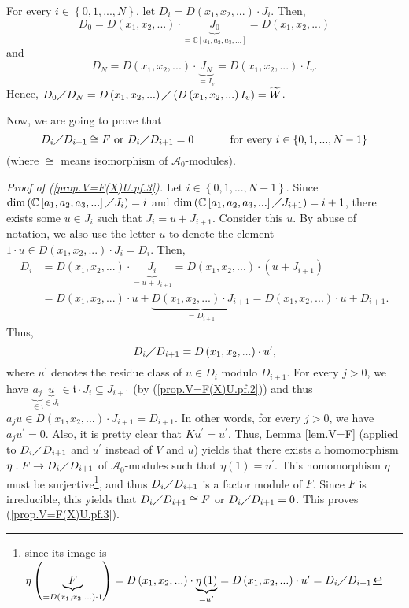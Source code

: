 \documentclass
[numbers=enddot,12pt,final,onecolumn,german,notitlepage]{scrartcl}%
\theoremstyle{definition}
\begin{document}
For every $i\in\left\{  0,1,...,N\right\}  $, let $D_{i}=D\left(  x_{1}%
,x_{2},...\right)  \cdot J_{i}$. Then,%
\[
D_{0}=D\left(  x_{1},x_{2},...\right)  \cdot\underbrace{J_{0}}_{=\mathbb{C}%
\left[  a_{1},a_{2},a_{3},...\right]  }=D\left(  x_{1},x_{2},...\right)
\]
and%
\[
D_{N}=D\left(  x_{1},x_{2},...\right)  \cdot\underbrace{J_{N}}_{=I_{v}%
}=D\left(  x_{1},x_{2},...\right)  \cdot I_{v}.
\]
Hence, $D_{0}\diagup D_{N}=D\left(  x_{1},x_{2},...\right)  \diagup\left(
D\left(  x_{1},x_{2},...\right)  I_{v}\right)  =\widetilde{W}$.

Now, we are going to prove that%
\begin{equation}
D_{i}\diagup D_{i+1}\cong F\text{ or }D_{i}\diagup D_{i+1}%
=0\ \ \ \ \ \ \ \ \ \ \text{for every }i\in\left\{  0,1,...,N-1\right\}
\label{prop.V=F(X)U.pf.3}%
\end{equation}
(where $\cong$ means isomorphism of $\mathcal{A}_{0}$-modules).

\textit{Proof of (\ref{prop.V=F(X)U.pf.3}).} Let $i\in\left\{
0,1,...,N-1\right\}  $. Since $\dim\left(  \mathbb{C}\left[  a_{1},a_{2}%
,a_{3},...\right]  \diagup J_{i}\right)  =i$ and $\dim\left(  \mathbb{C}%
\left[  a_{1},a_{2},a_{3},...\right]  \diagup J_{i+1}\right)  =i+1$, there
exists some $u\in J_{i}$ such that $J_{i}=u+J_{i+1}$. Consider this $u$. By
abuse of notation, we also use the letter $u$ to denote the element $1\cdot
u\in D\left(  x_{1},x_{2},...\right)  \cdot J_{i}=D_{i}$. Then,
\begin{align*}
D_{i}  &  =D\left(  x_{1},x_{2},...\right)  \cdot\underbrace{J_{i}%
}_{=u+J_{i+1}}=D\left(  x_{1},x_{2},...\right)  \cdot\left(  u+J_{i+1}\right)
\\
&  =D\left(  x_{1},x_{2},...\right)  \cdot u+\underbrace{D\left(  x_{1}%
,x_{2},...\right)  \cdot J_{i+1}}_{=D_{i+1}}=D\left(  x_{1},x_{2},...\right)
\cdot u+D_{i+1}.
\end{align*}
Thus,
\[
D_{i}\diagup D_{i+1}=D\left(  x_{1},x_{2},...\right)  \cdot u^{\prime},
\]
where $u^{\prime}$ denotes the residue class of $u\in D_{i}$ modulo $D_{i+1}$.
For every $j>0$, we have $\underbrace{a_{j}}_{\in\mathfrak{i}}\underbrace{u}%
_{\in J_{i}}\in\mathfrak{i}\cdot J_{i}\subseteq J_{i+1}$ (by
(\ref{prop.V=F(X)U.pf.2})) and thus $a_{j}u\in D\left(  x_{1},x_{2}%
,...\right)  \cdot J_{i+1}=D_{i+1}$. In other words, for every $j>0$, we have
$a_{j}u^{\prime}=0$. Also, it is pretty clear that $Ku^{\prime}=u^{\prime}$.
Thus, Lemma \ref{lem.V=F} (applied to $D_{i}\diagup D_{i+1}$ and $u^{\prime}$
instead of $V$ and $u$) yields that there exists a homomorphism $\eta
:F\rightarrow D_{i}\diagup D_{i+1}$ of $\mathcal{A}_{0}$-modules such that
$\eta\left(  1\right)  =u^{\prime}$. This homomorphism $\eta$ must be
surjective\footnote{since its image is $\eta\left(  \underbrace{F}_{=D\left(
x_{1},x_{2},...\right)  \cdot1}\right)  =D\left(  x_{1},x_{2},...\right)
\cdot\underbrace{\eta\left(  1\right)  }_{=u^{\prime}}=D\left(  x_{1}%
,x_{2},...\right)  \cdot u^{\prime}=D_{i}\diagup D_{i+1}$}, and thus
$D_{i}\diagup D_{i+1}$ is a factor module of $F$. Since $F$ is irreducible,
this yields that $D_{i}\diagup D_{i+1}\cong F$ or $D_{i}\diagup D_{i+1}=0$.
This proves (\ref{prop.V=F(X)U.pf.3}).
\end{document}
